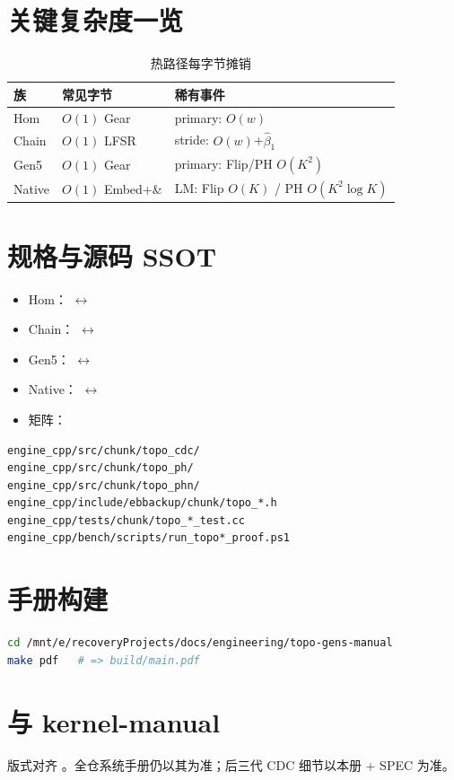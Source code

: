 \section{关键复杂度一览}

\begin{table}[htbp]
\centering
\caption{热路径每字节摊销}
\label{tab:complexity-all}
\begin{tabular}{@{}lll@{}}
\toprule
族 & 常见字节 & 稀有事件 \\
\midrule
Hom & $O(1)$ Gear & primary: $O(w)$ \\
Chain & $O(1)$ LFSR & stride: $O(w)$+$\hat\beta_1$ \\
Gen5 & $O(1)$ Gear & primary: Flip/PH $O(K^2)$ \\
Native & $O(1)$ Embed+\& & LM: Flip $O(K)$ / PH $O(K^2\log K)$ \\
\bottomrule
\end{tabular}
\end{table}

\section{规格与源码 SSOT}

\begin{itemize}[nosep]
  \item Hom： $\leftrightarrow$ 
  \item Chain： $\leftrightarrow$ 
  \item Gen5： $\leftrightarrow$ 
  \item Native： $\leftrightarrow$ 
  \item 矩阵：
\end{itemize}

\begin{lstlisting}[language=bash,caption={源码树},label={lst:src-tree}]
engine_cpp/src/chunk/topo_cdc/
engine_cpp/src/chunk/topo_ph/
engine_cpp/src/chunk/topo_phn/
engine_cpp/include/ebbackup/chunk/topo_*.h
engine_cpp/tests/chunk/topo_*_test.cc
engine_cpp/bench/scripts/run_topo*_proof.ps1
\end{lstlisting}

\section{手册构建}

\begin{lstlisting}[language=bash,caption={WSL XeLaTeX},label={lst:build-manual}]
cd /mnt/e/recoveryProjects/docs/engineering/topo-gens-manual
make pdf   # => build/main.pdf
\end{lstlisting}

\section{与 kernel-manual}

版式对齐 。全仓系统手册仍以其为准；后三代 CDC 细节以本册 + SPEC 为准。
